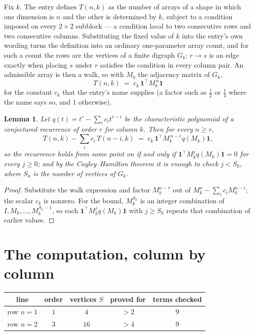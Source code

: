 \documentclass[11pt,a4paper]{article}
\theoremstyle{plain}
\newtheorem{lemma}[theorem]{Lemma}
\theoremstyle{definition}
\begin{document}
Fix $k$. The entry defines $T(n,k)$ as the number of arrays of a shape in which one dimension
is $n$ and the other is determined by $k$, subject to a condition imposed on every
$2\times2$ subblock --- a condition local to two consecutive rows and two consecutive columns.
Substituting the fixed value of $k$ into the entry's own wording turns the definition into an
ordinary one-parameter array count, and for such a count the rows are the vertices of a finite
digraph $G_k$: $r\to s$ is an edge exactly when placing $s$ under $r$ satisfies the condition
in every column pair. An admissible array is then a walk, so with $M_k$ the adjacency matrix
of $G_k$,
\[
T(n,k)\;=\;c_k\,\mathbf{1}^{\!\top}M_k^{\,n}\mathbf{1}
\]
for the constant $c_k$ that the entry's name supplies (a factor such as $\tfrac12$ or
$\tfrac14$ where the name says so, and $1$ otherwise).

\begin{lemma}\label{lem:crit}
Let $q(t)=t^{r}-\sum_i c_it^{r-i}$ be the characteristic polynomial of a conjectured
recurrence of order $r$ for column $k$. Then for every $n\ge r$,
\[
T(n,k)-\sum_i c_i\,T(n-i,k)\;=\;c_k\,\mathbf{1}^{\!\top}M_k^{\,n-r}q(M_k)\mathbf{1},
\]
so the recurrence holds from some point on if and only if
$\mathbf{1}^{\!\top}M_k^{j}q(M_k)\mathbf{1}=0$ for every $j\ge0$; and by the
Cayley--Hamilton theorem it is enough to check $j<S_k$, where $S_k$ is the number of vertices
of $G_k$.
\end{lemma}

\begin{proof}
Substitute the walk expression and factor $M_k^{n-r}$ out of $M_k^{n}-\sum_ic_iM_k^{n-i}$;
the scalar $c_k$ is nonzero. For the bound, $M_k^{S_k}$ is an integer combination of
$I,M_k,\dots,M_k^{S_k-1}$, so each $\mathbf{1}^{\!\top}M_k^{j}q(M_k)\mathbf{1}$ with
$j\ge S_k$ repeats that combination of earlier values.
\end{proof}

\section{The computation, column by column}

\begin{center}
\begin{tabular}{ccccc}
line & order & vertices $S$ & proved for & terms checked \\ \hline
row $n$$=1$ & $1$ & $4$ & $>2$ & $9$ \\
row $n$$=2$ & $3$ & $16$ & $>4$ & $9$ \\
\end{tabular}
\end{center}
\end{document}
